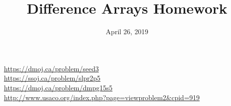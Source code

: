 \documentclass{problem-set}
\title{Difference Arrays Homework}
\date{April 26, 2019}
\begin{document}
\maketitle
{
  \parbox{\textwidth}{
    \url{https://dmoj.ca/problem/seed3} \\
    \url{https://ssoj.ca/problem/slpr2p5} \\
    \url{https://dmoj.ca/problem/dmpg15s5} \\
    \url{http://www.usaco.org/index.php?page=viewproblem2&cpid=919}
  }
}\\
\vspace{3em}\\
\parbox{\textwidth}{
}
\end{document}
